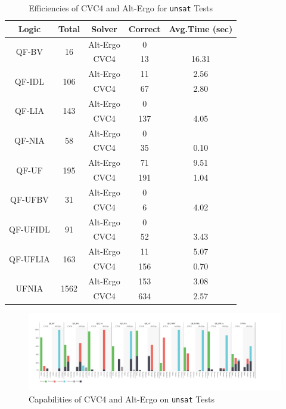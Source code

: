 \documentclass[10pt,letter]{article}
\theoremstyle{definition}
\begin{document}
\begin{table}[!ht]
\small
\centering
\begin{tabular}{|cc|c|cc|}
\hline
\bf  Logic & \bf Total &\bf Solver & \bf Correct & \bf Avg.Time \tiny{(sec)}\\\hline
  \multirow{2}{*}{QF-BV} &\multirow{2}{*}{16} & Alt-Ergo & 0 &  \\
  && CVC4 & 13 & 16.31 \\\hline
  \multirow{2}{*}{QF-IDL} &\multirow{2}{*}{106} & Alt-Ergo & 11 & 2.56\\
  &&  CVC4 & 67 & 2.80 \\\hline
  \multirow{2}{*}{QF-LIA} &\multirow{2}{*}{143} & Alt-Ergo & 0 & \\
  && CVC4 & 137 & 4.05\\\hline
  \multirow{2}{*}{QF-NIA} &\multirow{2}{*}{58} &  Alt-Ergo & 0 & \\
  & &  CVC4 & 35 & 0.10\\\hline
  \multirow{2}{*}{QF-UF} & \multirow{2}{*}{195} & Alt-Ergo & 71 & 9.51\\
  &  & CVC4 &191 & 1.04\\\hline
  \multirow{2}{*}{QF-UFBV} &  \multirow{2}{*}{31} &  Alt-Ergo & 0 & \\
  &  & CVC4 & 6 & 4.02\\\hline
  \multirow{2}{*}{QF-UFIDL} & \multirow{2}{*}{91} & Alt-Ergo & 0 & \\
  &  & CVC4 & 52 & 3.43\\\hline
  \multirow{2}{*}{QF-UFLIA} & \multirow{2}{*}{163} & Alt-Ergo & 11 & 5.07\\
  &  & CVC4 & 156 & 0.70\\\hline
  \multirow{2}{*}{UFNIA} & \multirow{2}{*}{1562} &Alt-Ergo & 153 & 3.08\\
  &  & CVC4 & 634 & 2.57\\\hline
\end{tabular}
\caption{Efficiencies of CVC4 and Alt-Ergo for {\tt unsat} Tests}
\label{t:eff}
\end{table}


\begin{figure}
\centering
\includegraphics[scale=0.45]{./testanalysis/unsatcap.pdf}
\caption{Capabilities of CVC4 and Alt-Ergo on {\tt unsat} Tests}
\label{f:unsatcap}
\end{figure}
\end{document}
